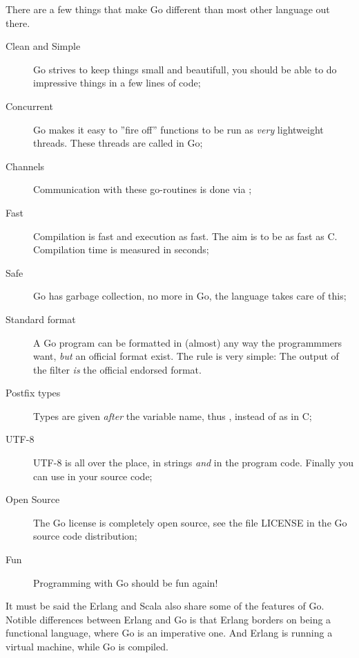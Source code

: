 \noindent{}There are a few things that make Go different than most other language
out there.
\begin{description}
\item[Clean and Simple]
Go strives to keep things small and beautifull, you should
be able to do impressive things in a few lines of code;
\item[Concurrent]
Go makes it easy to ''fire off'' functions to be
run as \emph{very} lightweight threads. These threads are called
 in Go;

\item[Channels] 
Communication with these go-routines is done
via  \cite{csp}\cite{ohoare};

\item[Fast]
Compilation is fast and execution as fast. The aim is
to be as fast as C. Compilation time is measured in seconds;

\item[Safe]
Go has garbage collection, no more  in Go,
the language takes care of this;

\item[Standard format]
A Go program can be formatted in (almost) any way the programmmers want,
\emph{but} an official format exist. The rule is very simple:
The output of the filter  \emph{is} the official endorsed
format.

\item[Postfix types]
Types are given \emph{after} the variable name, thus ,
instead of  as in C;

\item[UTF-8]
UTF-8 is all over the place, in strings
\emph{and} in the program code. Finally you can use  in your source code;

\item[Open Source]
The Go license is completely open source, see the file LICENSE in the Go
source code distribution;

\item[Fun]
Programming with Go should be fun again!

\end{description}
It must be said the Erlang \cite{erlang} and Scala \cite{scala} also share some
of the features of Go. Notible differences between Erlang
and Go is that Erlang borders on being a functional language,
where Go is an imperative one. And Erlang is running a virtual
machine, while Go is compiled. 

